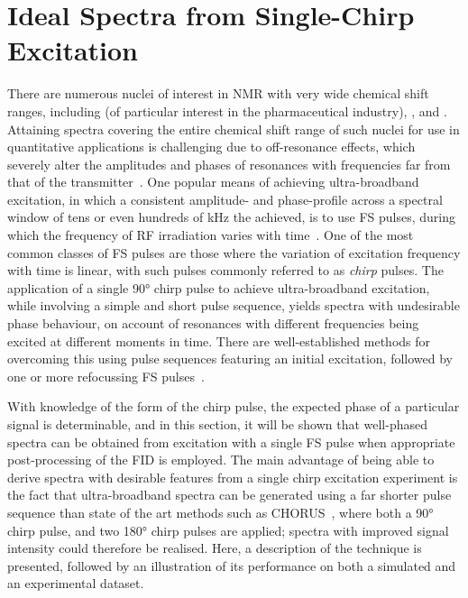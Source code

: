 \section{Ideal Spectra from Single-Chirp Excitation}
\label{sec:bbqchili}
There are numerous nuclei of interest in \ac{NMR} with very wide chemical shift
ranges, including  (of particular interest in the pharmaceutical
industry), , and .
Attaining spectra covering the entire chemical shift range of such nuclei for
use in quantitative applications is challenging due to off-resonance effects,
which severely alter the amplitudes and phases of resonances with frequencies
far from that of the transmitter~\cite[Section 3.4.1]{Cavanagh2007}. One
popular means of achieving ultra-broadband excitation, in which a consistent
amplitude- and phase-profile across a spectral window of tens or even hundreds
of \unit{\kilo\hertz} the achieved, is to use \ac{FS} pulses, during
which the frequency of \ac{RF} irradiation varies with
time~\cite{Foroozandeh2020}. One of the most common classes of \ac{FS} pulses
are those where the variation of excitation frequency with time is linear, with
such pulses commonly referred to as \emph{chirp} pulses. The application of a
single \ang{90} chirp pulse to achieve ultra-broadband excitation, while
involving a simple and short pulse sequence, yields
spectra with undesirable phase behaviour, on account of resonances with
different frequencies being excited at different moments in time.
There are well-established methods for overcoming this using
pulse sequences featuring an initial excitation, followed by one or more
refocussing \ac{FS}
pulses~\cite{Bohlen1989,Bohlen1993,Cano2002,Power2016,Foroozandeh2019}.

With knowledge of the form of the chirp pulse, the expected phase of a
particular signal is determinable, and in this section, it will be shown
that well-phased spectra can be obtained from excitation with a single \ac{FS}
pulse when appropriate post-processing of the \ac{FID} is employed.
The main advantage of being able to derive spectra with desirable features from
a single chirp excitation experiment is the fact that ultra-broadband spectra
can be generated using a far shorter pulse sequence than state of the art
methods such as \ac{CHORUS}~\cite{Power2016,Foroozandeh2019}, where both a
\ang{90} chirp pulse, and two \ang{180} chirp pulses are applied; spectra with
improved signal intensity could therefore be realised. Here, a description of the
technique is presented, followed by an illustration of its performance on both a
simulated and an experimental dataset.

